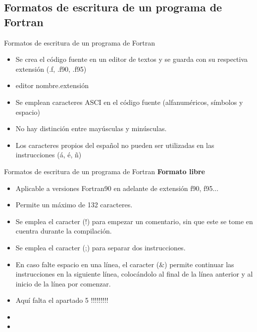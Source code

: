 
\subsection{Formatos de escritura de un programa de Fortran}

\begin{frame}[fragile]{Formatos de escritura de un programa de Fortran}
  \begin{itemize}[<+(1)->]
  \item Se crea el código fuente en un editor de textos y se guarda con su respectiva extensión (.f, .f90, .f95)
  \item [] \begin{mintedbash} 
            editor nombre.extensión
           \end{mintedbash}
  \item Se emplean caracteres ASCI en el código fuente (alfanuméricos, símbolos y espacio)
  \item No hay distinción entre mayúsculas y minúsculas.
  \item Los caracteres propios del español no pueden ser utilizadas en las instrucciones (á, é, ñ)
  \end{itemize}
\end{frame}

\begin{frame}[fragile]{Formatos de escritura de un programa de Fortran}
 \textbf{Formato libre}
  \begin{itemize}[<+(1)->]
   \item Aplicable a versiones Fortran90 en adelante de extensión f90, f95...  
   \item Permite un máximo de 132 caracteres.
   \item Se emplea el caracter (!) para empezar un comentario, sin que este se tome en cuentra durante la compilación.
   \item Se emplea el caracter (;) para separar dos instrucciones.
   \item En caso falte espacio en una línea, el caracter (\&) permite continuar las instrucciones en la siguiente línea, colocándolo al final de la línea anterior y al inicio de la línea por comenzar.
   \item Aquí falta el apartado 5 !!!!!!!!!
   \item 
   \item 
  \end{itemize}
\end{frame}

